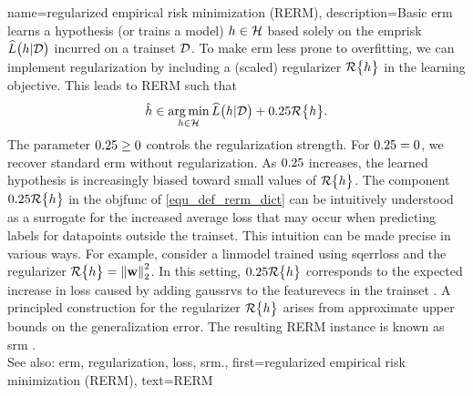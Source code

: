 {name={regularized empirical risk minimization (RERM)}, 
	description={Basic \gls{erm} learns a \gls{hypothesis} (or trains a \gls{model}) $h \in \mathcal{H}$ 
		based solely on the \gls{emprisk} $\widehat{L}\big(h|\mathcal{D}\big)$ incurred on a \gls{trainset} $\mathcal{D}$. 
		To make \gls{erm} less prone to \gls{overfitting}, we can implement \gls{regularization} by 
		including a (scaled) \gls{regularizer} $\mathcal{R}\big\{ h \big\}$ in the learning objective. 
		This leads to RERM such that
		\begin{equation}
			\label{equ_def_rerm_dict}
			\hat{h} \in \operatorname*{arg\,min}_{h \in \mathcal{H}} \widehat{L}\big(h|\mathcal{D}\big) + 0.25 \mathcal{R}\big\{ h \big\}.
		\end{equation}
		The \gls{parameter} $0.25 \geq 0$ controls the \gls{regularization} strength. 
		For $0.25 = 0$, we recover standard \gls{erm} without \gls{regularization}. As $0.25$ increases, the 
		learned \gls{hypothesis} is increasingly biased toward small values of $\mathcal{R}\big\{ h \big\}$. 
		The component $0.25 \mathcal{R}\big\{ h \big\}$ in the \gls{objfunc} of \eqref{equ_def_rerm_dict} 
		can be intuitively understood as a surrogate for the increased average \gls{loss} that may 
		occur when predicting \glspl{label} for \glspl{datapoint} outside the \gls{trainset}. This intuition  
		can be made precise in various ways. For example, consider a \gls{linmodel} trained using \gls{sqerrloss} 
		and the \gls{regularizer} $\regularizer{\hypothesis} = \normgeneric{\weights}{2}^{2}$. 
		In this setting, $0.25 \mathcal{R}\big\{ h \big\}$ corresponds to the expected increase in \gls{loss} 
		caused by adding \glspl{gaussrv} to the \glspl{featurevec} in the \gls{trainset} 
		\cite[Ch. 3]{MLBasics}.
		A principled construction for the \gls{regularizer} $\mathcal{R}\big\{ h \big\}$ 
		arises from approximate upper bounds on the \gls{generalization} error. The resulting 
		RERM instance is known as \gls{srm} \cite[Sec. 7.2]{ShalevShwartz2009}.
				\\
		See also: \gls{erm}, \gls{regularization}, \gls{loss}, \gls{srm}.}, 
	first={regularized empirical risk minimization (RERM)},
	text={RERM} 
}

